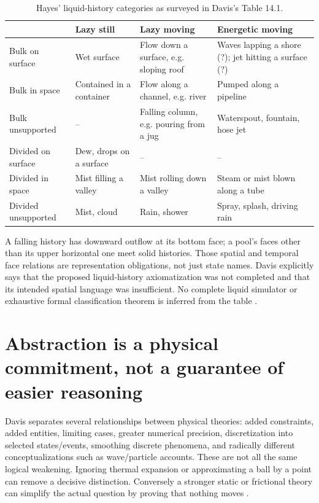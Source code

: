 \begin{table}[ht]
\centering
\begin{tabular}{p{.19\linewidth}p{.22\linewidth}p{.22\linewidth}p{.22\linewidth}}
 & Lazy still & Lazy moving & Energetic moving\\\hline
Bulk on surface & Wet surface & Flow down a surface, e.g. sloping roof
 & Waves lapping a shore (?); jet hitting a surface (?)\\
Bulk in space & Contained in a container & Flow along a channel, e.g. river
 & Pumped along a pipeline\\
Bulk unsupported & -- & Falling column, e.g. pouring from a jug
 & Waterspout, fountain, hose jet\\
Divided on surface & Dew, drops on a surface & -- & --\\
Divided in space & Mist filling a valley & Mist rolling down a valley
 & Steam or mist blown along a tube\\
Divided unsupported & Mist, cloud & Rain, shower & Spray, splash, driving rain
\end{tabular}
\caption{Hayes' liquid-history categories as surveyed in Davis's Table 14.1.}
\label{tab:p16-phys-liquid-histories}
\end{table}

A falling history has downward outflow at its bottom face; a pool's faces
other than its upper horizontal one meet solid histories. Those spatial
and temporal face relations are representation obligations, not just state
names. Davis explicitly says that the proposed liquid-history axiomatization
was not completed and that its intended spatial language was insufficient.
No complete liquid simulator or exhaustive formal classification theorem
is inferred from the table \cite[pp.~610--611]{Davis2008PhysicalReasoning}.

\section{Abstraction is a physical commitment, not a guarantee of easier reasoning}
\label{sec:p16-phys-abstraction}

Davis separates several relationships between physical theories: added
constraints, added entities, limiting cases, greater numerical precision,
discretization into selected states/events, smoothing discrete phenomena,
and radically different conceptualizations such as wave/particle accounts.
These are not all the same logical weakening. Ignoring thermal expansion
or approximating a ball by a point can remove a decisive distinction.
Conversely a stronger static or frictional theory can simplify the actual
question by proving that nothing moves
\cite[pp.~611--614]{Davis2008PhysicalReasoning}.

